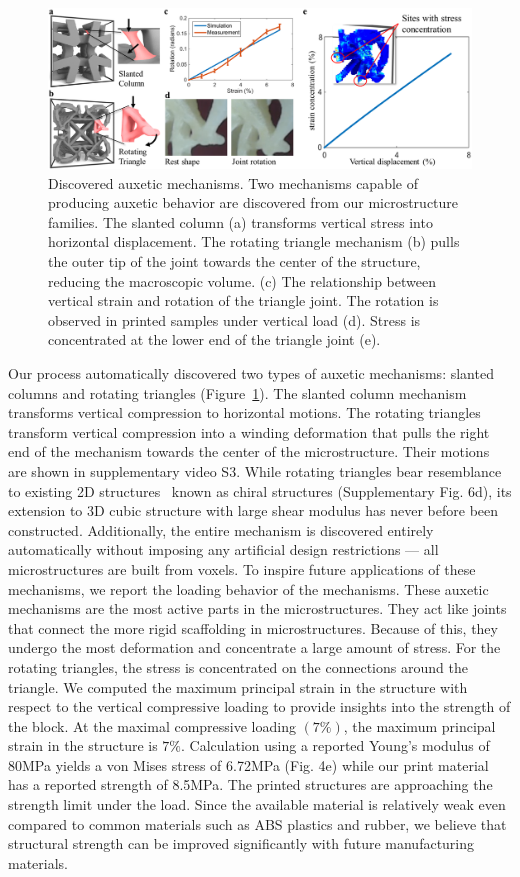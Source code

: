 \begin{figure}
	\includegraphics[width=\columnwidth]{images/auxeticMech.png}
	\caption{Discovered auxetic mechanisms. Two mechanisms capable of producing auxetic behavior are discovered from our microstructure families. The slanted column (a) transforms vertical stress into horizontal displacement. The rotating triangle mechanism (b) pulls the outer tip of the joint towards the center of the structure, reducing the macroscopic volume. (c) The relationship between vertical strain and rotation of the triangle joint. The rotation is observed in printed samples under vertical load (d). Stress is concentrated at the lower end of the triangle joint (e).}
	\label{fig:auxeticMech}
\end{figure}
Our process automatically discovered two types of auxetic mechanisms: slanted columns and rotating triangles (Figure~\ref{fig:auxeticMech}). The slanted column mechanism transforms vertical compression to horizontal motions. The rotating triangles transform vertical compression into a winding deformation that pulls the right end of the mechanism towards the center of the microstructure.
Their motions are shown in supplementary video S3.
While rotating triangles bear resemblance to existing 2D structures~\citep{alderson2010elastic} known as chiral structures (Supplementary Fig. 6d), its extension to 3D cubic structure with large shear modulus has never before been constructed. Additionally, the entire mechanism is discovered entirely automatically without imposing any artificial design restrictions --- all microstructures are built from voxels. To inspire future applications of these mechanisms, we report the loading behavior of the mechanisms. These auxetic mechanisms are the most active parts in the microstructures. They act like joints that connect the more rigid scaffolding in microstructures. Because of this, they undergo the most deformation and concentrate a large amount of stress. For the rotating triangles, the stress is concentrated on the connections around the triangle. We computed the maximum principal strain in the structure with respect to the vertical compressive loading to provide insights into the strength of the block.
At the maximal compressive loading $(7\%)$, the maximum principal strain in the structure is $7\%$. Calculation using a reported Young's modulus of 80MPa yields a von Mises stress of 6.72MPa (Fig. 4e) while our print material has a reported strength of 8.5MPa. The printed structures are approaching the strength limit under the load. Since the available material is relatively weak even compared to common materials such as ABS plastics and rubber, we believe that structural strength can be improved significantly with future manufacturing materials.

